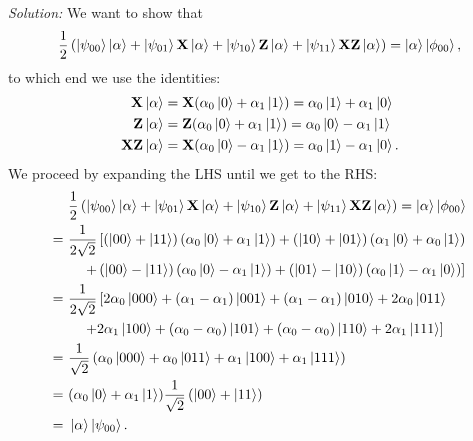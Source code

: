 \documentclass{book}
\theoremstyle{definition}
\newcommand{\nn}{\nonumber}
\newcommand{\al}{\alpha}
\newcommand{\X}{\mathbf{X}}
\newcommand{\f}[2]{\frac{#1}{#2}}
\newcommand{\lp}{\left(}
\newcommand{\rp}{\right)}
\newcommand{\lb}{\left[}
\newcommand{\rb}{\right]}
\newcommand{\Z}{\mathbf{Z}}
\begin{document}
\noindent \textit{Solution:} 
We want to show that 
\begin{align}
\f{1}{2} \lp \ket{\psi_{00}}\ket{\al} + \ket{\psi_{01}}\X\ket{\al} + \ket{\psi_{10}}\Z\ket{\al} + \ket{\psi_{11}}\X \Z \ket{\al} \rp = \ket{\al}\ket{\phi_{00}},
\end{align}
to which end we use the identities:
\begin{align}
\X \ket{\al} &= \X (\al_0 \ket{0} + \al_1 \ket{1}) = \al_0\ket{1} + \al_1\ket{0}\nn\\
\Z \ket{\al} &= \Z (\al_0 \ket{0} + \al_1 \ket{1}) = \al_0 \ket{0} - \al_1\ket{1}\nn\\
\X\Z\ket{\al} &= \X (\al_0 \ket{0} - \al_1\ket{1}) = \al_0 \ket{1} - \al_1 \ket{0}.
\end{align}
We proceed by expanding the LHS until we get to the RHS:
\begin{align}
&\,\,\f{1}{2} \lp \ket{\psi_{00}}\ket{\al} + \ket{\psi_{01}}\X\ket{\al} + \ket{\psi_{10}}\Z\ket{\al} + \ket{\psi_{11}}\X \Z \ket{\al} \rp = \ket{\al}\ket{\phi_{00}}\nn\\
=&\,\, \f{1}{2\sqrt{2}}\lb \lp \ket{00} + \ket{11} \rp\lp \al_0 \ket{0} + \al_1 \ket{1} \rp  + \lp \ket{10} + \ket{01} \rp \lp \al_1\ket{0} + \al_0\ket{1} \rp\right.\nn\\
&\,\,\quad\left. + \lp \ket{00} - \ket{11} \rp  \lp \al_0 \ket{0} - \al_1\ket{1} \rp + \lp \ket{01} - \ket{10} \rp\lp \al_0\ket{1} - \al_1\ket{0} \rp  \rb\nn\\
=&\,\, \f{1}{2\sqrt{2}}\lb 2\al_0\ket{000} + (\al_1-\al_1) \ket{001} + (\al_1-\al_1)\ket{010} + 2\al_0 \ket{011} \right.\nn\\
&\,\,\quad\left. +2\al_1\ket{100} + (\al_0 - \al_0)\ket{101} + (\al_0 - \al_0)\ket{110} + 2\al_1 \ket{111} \rb\nn\\
=&\,\, \f{1}{\sqrt{2}} \lp \al_0 \ket{000} + \al_0 \ket{011} + \al_1\ket{100} + \al_1\ket{111} \rp\nn\\
=&\,\, (\al_0\ket{0} + \al_1\ket{1}) \f{1}{\sqrt{2}}\lp \ket{00} + \ket{11}  \rp\nn\\
=&\,\, \ket{\al}\ket{\psi_{00}}.
\end{align}
\end{document}
